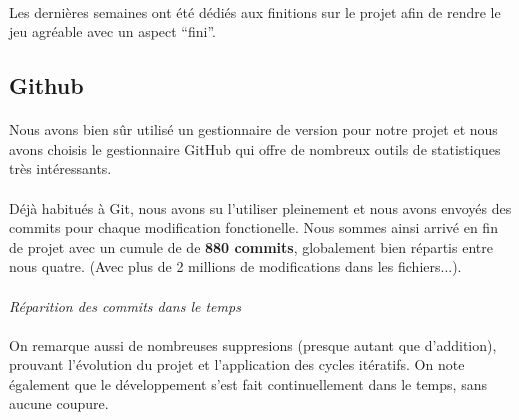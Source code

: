 \paragraph{}
Les dernières semaines ont été dédiés aux finitions sur le projet afin de rendre le jeu agréable avec un aspect “fini”.

\subsection{Github}

\paragraph{}
Nous avons bien sûr utilisé un gestionnaire de version pour notre projet et nous avons choisis le gestionnaire GitHub qui offre de nombreux outils de statistiques très intéressants.

\paragraph{}
Déjà habitués à Git, nous avons su l’utiliser pleinement et nous avons envoyés des commits pour chaque modification fonctionelle. Nous sommes ainsi arrivé en fin de projet avec un cumule de de \textbf{880 commits}, globalement bien répartis entre nous quatre. (Avec plus de 2 millions de modifications dans les fichiers...).

\paragraph{}
\noindent
{}
\begin{center}
\textit{Réparition des commits dans le temps}
\end{center}

\paragraph{}
On remarque aussi de nombreuses suppresions (presque autant que d’addition), prouvant l’évolution du projet et l’application des cycles itératifs. On note également que le développement s’est fait continuellement dans le temps, sans aucune coupure.

